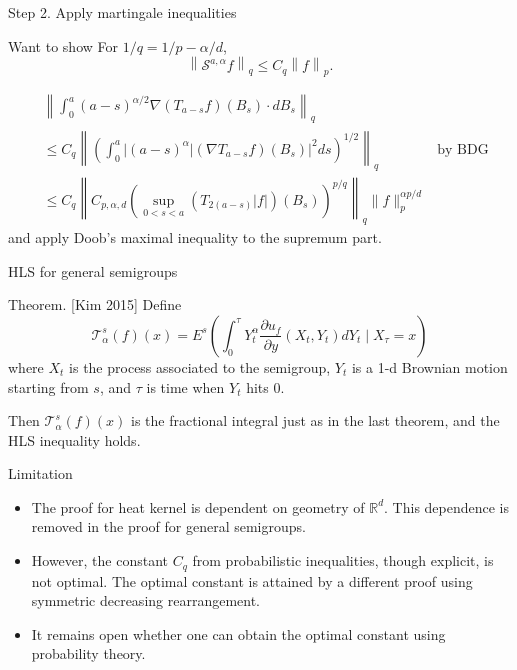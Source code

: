 \documentclass{if-beamer}
\begin{document}
\begin{frame}{Step 2. Apply martingale inequalities}
    \begin{block}{Want to show}
        For $1/q = 1/p - \alpha/d$,
        \[
        \left\|\mathcal{S}^{a, \alpha} f\right\|_q \leq C_q \left\|f\right\|_p
        .\]
    \end{block}
    \begin{align}
        &\left\| \int_0^a (a - s)^{\alpha/2} \nabla(T_{a-s} f)(B_s) \cdot dB_s \right\|_q\\
        &\leq C_q \left\| \left( \int_0^a |(a - s)^{\alpha} \left| (\nabla T_{a-s} f)(B_s) \right|^2 ds \right)^{1/2} \right\|_q  & \text{by BDG} \\
        &\leq C_q \left\| C_{p, \alpha, d} \left( \sup_{0 < s < a} \left( T_{2 (a - s)}  |f| \right) (B_s) \right) ^{p / q} \right\|_q \|f\|_p^{\alpha p / d}
    \end{align}
    and apply Doob's maximal inequality to the supremum part.
\end{frame}

\begin{frame}{HLS for general semigroups}
    \begin{block}{Theorem. [Kim 2015]}
        Define
        \begin{equation*}
            \mathcal{T}_\alpha^s(f)(x) = E^s \left( \int_0^\tau Y_t^\alpha \frac{\partial u_f}{\partial y} (X_t, Y_t) d Y_t \mid X_\tau = x \right)
        \end{equation*}
        where $X_t$ is the process associated to the semigroup, $Y_t$ is a 1-d Brownian motion starting from $s$, and $\tau$ is time when $Y_t$ hits $0$.

        Then $\mathcal{T}_\alpha^s(f)(x)$ is the fractional integral just as in the last theorem, and the HLS inequality holds.
    \end{block}
    \begin{exampleblock}{Limitation}
        \begin{itemize}
            \item The proof for heat kernel is dependent on geometry of $\mathbb{R}^d$. This dependence is removed in the proof for general semigroups.
            \item However, the constant $C_q$ from probabilistic inequalities, though explicit, is not optimal. The optimal constant is attained by a different proof using symmetric decreasing rearrangement.
            \item It remains open whether one can obtain the optimal constant using probability theory.
        \end{itemize}
    \end{exampleblock}
\end{frame}
\end{document}
